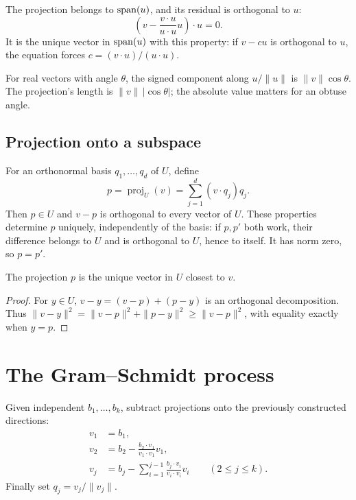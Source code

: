 The projection belongs to $\operatorname{span}(u)$, and its residual is orthogonal to $u$:
\[
 \left(v-\frac{v\cdot u}{u\cdot u}u\right)\cdot u=0.
\]
It is the unique vector in $\operatorname{span}(u)$ with this property:
if $v-cu$ is orthogonal to $u$, the equation forces
$c=(v\cdot u)/(u\cdot u)$.

\begin{center}

\end{center}

For real vectors with angle $\theta$, the signed component along
$u/\|u\|$ is $\|v\|\cos\theta$.
The projection's length is $\|v\|\,|\cos\theta|$;
the absolute value matters for an obtuse angle.

\subsection{Projection onto a subspace}

For an orthonormal basis $q_1,\ldots,q_d$ of $U$, define
\[
 p=\operatorname{proj}_U(v)=\sum_{j=1}^d(v\cdot q_j)q_j.
\]
Then $p\in U$ and $v-p$ is orthogonal to every vector of $U$.
These properties determine $p$ uniquely, independently of the basis:
if $p,p'$ both work, their difference belongs to $U$ and is orthogonal
to $U$, hence to itself. It has norm zero, so $p=p'$.

\begin{proposition}
The projection $p$ is the unique vector in $U$ closest to $v$.
\end{proposition}
\begin{proof}
For $y\in U$, $v-y=(v-p)+(p-y)$ is an orthogonal decomposition.
Thus $\|v-y\|^2=\|v-p\|^2+\|p-y\|^2\geq\|v-p\|^2$,
with equality exactly when $y=p$.
\end{proof}

\section{The Gram--Schmidt process}

Given independent $b_1,\ldots,b_k$, subtract projections onto the
previously constructed directions:
\begin{align*}
 v_1&=b_1,\\
 v_2&=b_2-\frac{b_2\cdot v_1}{v_1\cdot v_1}v_1,\\
 v_j&=b_j-\sum_{i=1}^{j-1}
             \frac{b_j\cdot v_i}{v_i\cdot v_i}v_i
             \qquad(2\leq j\leq k).
\end{align*}
Finally set $q_j=v_j/\|v_j\|$.

